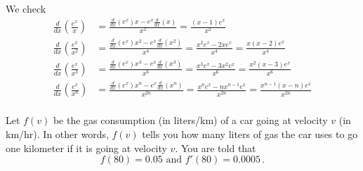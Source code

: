 \documentclass[11pt]{exam}
\newcommand{\ddx}{\frac{d}{dx}}
\begin{document}
\begin{questions}
    \begin{solution}
      We check
      \begin{align*}
        \ddx\left( \frac{e^x}{x} \right)
        & = \frac{\ddx(e^x)x-e^x\ddx(x)}{x^2} = \frac{(x-1)e^x}{x^2}\\
        \ddx\left( \frac{e^x}{x^2} \right)
        & = \frac{\ddx(e^x)x^2-e^x\ddx(x^2)}{x^4} =\frac{x^2e^x-2xe^x}{x^4} = \frac{x(x-2)e^x}{x^4}\\
        \ddx\left( \frac{e^x}{x^3} \right)
        & = \frac{\ddx(e^x)x^3-e^x\ddx(x^3)}{x^6} =\frac{x^3e^x-3x^2e^x}{x^6} = \frac{x^2(x-3)e^x}{x^6}\\
        \ddx\left( \frac{e^x}{x^n} \right)
        & = \frac{\ddx(e^x)x^n-e^x\ddx(x^n)}{x^{2n}} =\frac{x^ne^x-nx^{n-1}e^x}{x^{2n}} = \frac{x^{n-1}(x-n)e^x}{x^{2n}}\\
      \end{align*}
    \end{solution}
  \question Let \(f(v)\) be the gas consumption (in liters/km) of a
    car going at velocity \(v\) (in km/hr). In other words, \(f(v)\)
    tells you how many liters of gas the car uses to go one kilometer
    if it is going at velocity \(v\). You are told that \[
      f(80) = 0.05 \text{ and }f'(80) = 0.0005 \,.
    \]
\end{questions}
\end{document}
